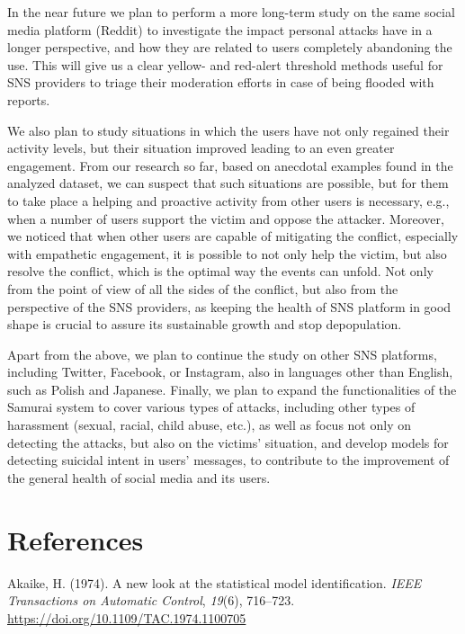 \documentclass[10pt,dvipsnames]{scrartcl}
\begin{document}
In the near future we plan to perform a more long-term study on the same
social media platform (Reddit) to investigate the impact personal
attacks have in a longer perspective, and how they are related to users
completely abandoning the use. This will give us a clear yellow- and
red-alert threshold methods useful for SNS providers to triage their
moderation efforts in case of being flooded with reports.

We also plan to study situations in which the users have not only
regained their activity levels, but their situation improved leading to
an even greater engagement. From our research so far, based on anecdotal
examples found in the analyzed dataset, we can suspect that such
situations are possible, but for them to take place a helping and
proactive activity from other users is necessary, e.g., when a number of
users support the victim and oppose the attacker. Moreover, we noticed
that when other users are capable of mitigating the conflict, especially
with empathetic engagement, it is possible to not only help the victim,
but also resolve the conflict, which is the optimal way the events can
unfold. Not only from the point of view of all the sides of the
conflict, but also from the perspective of the SNS providers, as keeping
the health of SNS platform in good shape is crucial to assure its
sustainable growth and stop depopulation.

Apart from the above, we plan to continue the study on other SNS
platforms, including Twitter, Facebook, or Instagram, also in languages
other than English, such as Polish and Japanese. Finally, we plan to
expand the functionalities of the \textsf{ Samurai} system to cover
various types of attacks, including other types of harassment (sexual,
racial, child abuse, etc.), as well as focus not only on detecting the
attacks, but also on the victims' situation, and develop models for
detecting suicidal intent in users' messages, to contribute to the
improvement of the general health of social media and its users.

\newpage

\section*{References}

\hypertarget{refs}{}
\hypertarget{ref-Akaike1974model}{}
Akaike, H. (1974). A new look at the statistical model identification.
\emph{IEEE Transactions on Automatic Control}, \emph{19}(6), 716--723.
\url{https://doi.org/10.1109/TAC.1974.1100705}
\end{document}
